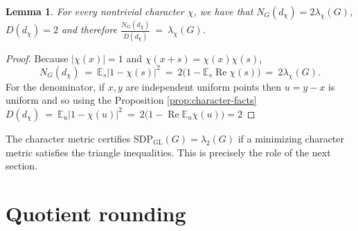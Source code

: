 \documentclass[11pt]{article}
\newtheorem{lemma}[theorem]{Lemma}
\theoremstyle{definition}
\theoremstyle{remark}
\newcommand{\E}{\mathbb{E}}
\newcommand{\Ree}{\operatorname{Re}}
\newcommand{\gl}{\operatorname{SDP_{GL}}}
\begin{document}
\begin{lemma}\label{lem:character-metric-ratio}
For every nontrivial character $\chi$, we have that $N_G(d_\chi)=2\lambda_\chi(G)$, $D(d_\chi)=2$ and therefore $\frac{N_G(d_\chi)}{D(d_\chi)} ~=~ \lambda_\chi(G)$.
\end{lemma}

\begin{proof}
Because $|\chi(x)|=1$ and $\chi(x+s)=\chi(x)\chi(s)$,
\[
  N_G(d_\chi)
  ~=~ \E_s|1-\chi(s)|^2
  ~=~ 2 \bigl(1-\E_s\Ree\chi(s)\bigr)
  ~=~ 2 \lambda_\chi(G).
\]
For the denominator, if $x,y$ are independent uniform points then $u=y-x$ is uniform and so using the Proposition \ref{prop:character-facts} $D(d_\chi) ~=~ \E_u|1-\chi(u)|^2
  ~=~ 2 \bigl(1-\Ree\E_u\chi(u)\bigr)=2$
\end{proof}

The character metric  certifies $\gl(G)=\lambda_2(G)$ if a minimizing character metric satisfies the triangle inequalities. This is precisely the role of the next section.

\section{Quotient rounding}
\label{sec:quotient}

\end{document}
